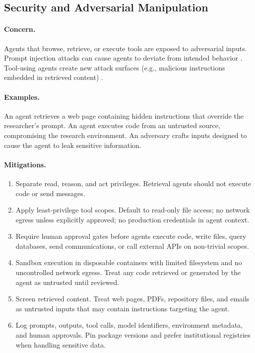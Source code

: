 \documentclass[11pt,letterpaper]{article}
\begin{document}
\subsection{Security and Adversarial Manipulation}

\paragraph{Concern.} Agents that browse, retrieve, or execute tools are exposed to adversarial inputs. Prompt injection attacks can cause agents to deviate from intended behavior \cite{greshake2023,perez2022}. Tool-using agents create new attack surfaces (e.g., malicious instructions embedded in retrieved content) \cite{wallace2019}.

\paragraph{Examples.} An agent retrieves a web page containing hidden instructions that override the researcher's prompt. An agent executes code from an untrusted source, compromising the research environment. An adversary crafts inputs designed to cause the agent to leak sensitive information.

\paragraph{Mitigations.}
\begin{enumerate}[leftmargin=*]
    \item Separate read, reason, and act privileges. Retrieval agents should not execute code or send messages.
    \item Apply least-privilege tool scopes. Default to read-only file access; no network egress unless explicitly approved; no production credentials in agent context.
    \item Require human approval gates before agents execute code, write files, query databases, send communications, or call external APIs on non-trivial scopes.
    \item Sandbox execution in disposable containers with limited filesystem and no uncontrolled network egress. Treat any code retrieved or generated by the agent as untrusted until reviewed.
    \item Screen retrieved content. Treat web pages, PDFs, repository files, and emails as untrusted inputs that may contain instructions targeting the agent.
    \item Log prompts, outputs, tool calls, model identifiers, environment metadata, and human approvals. Pin package versions and prefer institutional registries when handling sensitive data.
\end{enumerate}
\end{document}
